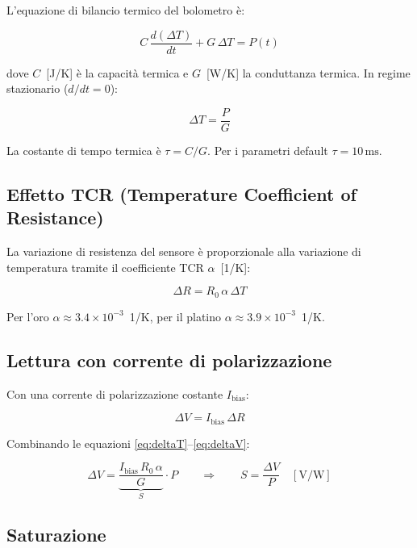 \documentclass[11pt,a4paper]{article}
\begin{document}
L'equazione di bilancio termico del bolometro è:

\begin{equation}
  C\,\frac{d(\Delta T)}{dt} + G\,\Delta T = P(t)
\end{equation}

dove $C$~[J/K] è la capacità termica e $G$~[W/K] la conduttanza termica.
In regime stazionario ($d/dt = 0$):

\begin{equation}
  \boxed{\Delta T = \frac{P}{G}}
  \label{eq:deltaT}
\end{equation}

La costante di tempo termica è $\tau = C/G$. Per i parametri default
$\tau = 10\,\mathrm{ms}$.

\subsection{Effetto TCR (Temperature Coefficient of Resistance)}

La variazione di resistenza del sensore è proporzionale alla variazione
di temperatura tramite il coefficiente TCR $\alpha$~[1/K]:

\begin{equation}
  \Delta R = R_0\,\alpha\,\Delta T
  \label{eq:deltaR}
\end{equation}

Per l'oro $\alpha \approx 3.4 \times 10^{-3}$~1/K, per il platino
$\alpha \approx 3.9 \times 10^{-3}$~1/K.

\subsection{Lettura con corrente di polarizzazione}

Con una corrente di polarizzazione costante $I_{\text{bias}}$:

\begin{equation}
  \Delta V = I_{\text{bias}}\,\Delta R
  \label{eq:deltaV}
\end{equation}

Combinando le equazioni \eqref{eq:deltaT}--\eqref{eq:deltaV}:

\begin{equation}
  \boxed{\Delta V = \underbrace{\frac{I_{\text{bias}}\,R_0\,\alpha}{G}}_{S}\cdot P
  \qquad \Rightarrow \qquad S = \frac{\Delta V}{P} \quad [\text{V/W}]}
  \label{eq:sensitivity}
\end{equation}

\subsection{Saturazione}
\end{document}
